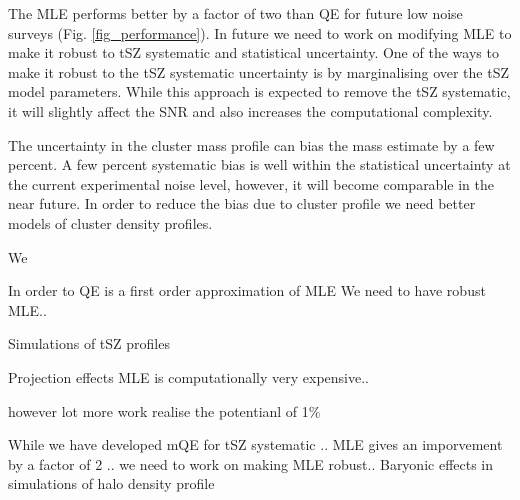 The MLE performs better by a factor of two than QE for future low noise surveys (Fig. \ref{fig_performance}). 
In future we need to work on modifying MLE to make it robust to tSZ systematic and statistical uncertainty. 
One of the ways to make it robust to the tSZ systematic uncertainty is by marginalising over the tSZ model parameters. 	
While this approach is expected to remove the tSZ systematic, it will slightly affect the SNR and also increases the computational complexity. 

The uncertainty in the cluster mass profile can bias the mass estimate by a few percent. 
A few percent systematic bias is well within the statistical uncertainty at the current experimental noise level, however, it will become comparable in the near future. 
In order to reduce the bias due to cluster profile we need better models of cluster density profiles.

We 




In order to 
QE is a first order approximation of MLE
We need to have robust MLE..

Simulations of tSZ profiles

Projection effects
MLE is computationally very expensive.. 

however lot more work realise the potentianl of 1\% 

While we have developed mQE for tSZ systematic ..
MLE gives an imporvement by a factor of 2 ..
we need to work on making MLE robust.. 
Baryonic effects in simulations of halo density profile


